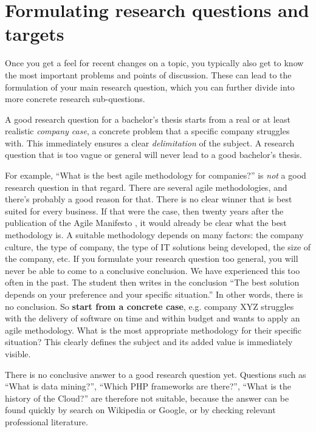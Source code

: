 \section{Formulating research questions and targets}
\label{sec:formulatingresearchquestion}

Once you get a feel for recent changes on a topic, you typically also get to know the most important problems and points of discussion. These can lead to the formulation of your main research question, which you can further divide into more concrete research sub-questions.

A good research question for a bachelor's thesis starts from a real or at least realistic \textit{company case}, a concrete problem that a specific company struggles with. This immediately ensures a clear \textit{delimitation} of the subject. A research question that is too vague or general will never lead to a good bachelor's thesis.

For example, ``What is the best agile methodology for companies?'' is \textit{not} a good research question in that regard. There are several agile methodologies, and there's probably a good reason for that. There is no clear winner that is best suited for every business. If that were the case, then twenty years after the publication of the Agile Manifesto \autocite{BeckEtAl2001}, it would already be clear what the best methodology is. A suitable methodology depends on many factors: the company culture, the type of company, the type of IT solutions being developed, the size of the company, etc. If you formulate your research question too general, you will never be able to come to a conclusive conclusion. We have experienced this too often in the past. The student then writes in the conclusion ``The best solution depends on your preference and your specific situation.'' In other words, there is no conclusion. So \textbf{start from a concrete case}, e.g. company XYZ struggles with the delivery of software on time and within budget and wants to apply an agile methodology. What is the most appropriate methodology for their specific situation? This clearly defines the subject and its added value is immediately visible.

There is no conclusive answer to a good research question yet. Questions such as ``What is data mining?'', ``Which PHP frameworks are there?'', ``What is the history of the Cloud?'' are therefore not suitable, because the answer can be found quickly by search on Wikipedia or Google, or by checking relevant professional literature.

